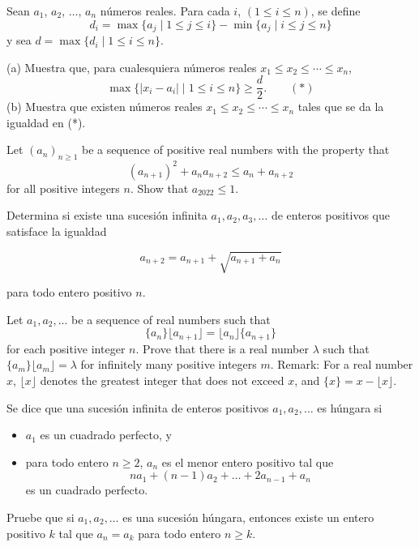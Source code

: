 \documentclass[11pt]{scrartcl}
\begin{document}
\begin{problem}
    Sean $ a_{1}$, $ a_{2}$, $ \ldots$, $ a_{n}$ números reales. Para cada $ i$, $ (1 \leq i \leq n )$, se define
\[ d_{i} = \max \{ a_{j}\mid 1 \leq j \leq i \} - \min \{ a_{j}\mid i \leq j \leq n \}
\]
y sea $ d = \max \{d_{i}\mid 1 \leq i \leq n \}$.

(a) Muestra que, para cualesquiera números reales $ x_{1}\leq x_{2}\leq \cdots \leq x_{n}$,
\[ \max \{ |x_{i} - a_{i}| \mid 1 \leq i \leq n \}\geq \frac {d}{2}. \quad \quad (*)
\]
(b) Muestra que existen números reales $ x_{1}\leq x_{2}\leq \cdots \leq x_{n}$ tales que se da la igualdad en (*).
\end{problem}


\begin{problem}
    Let $(a_n)_{n\geq 1}$ be a sequence of positive real numbers with the property that
$$(a_{n+1})^2 + a_na_{n+2} \leq a_n + a_{n+2}$$for all positive integers $n$. Show that $a_{2022}\leq 1$.
\end{problem}
\begin{problem}
    
    Determina si existe una sucesión infinita $a_1, a_2, a_3, \dots$ de enteros positivos que satisface
la igualdad

\[a_{n+2}=a_{n+1}+\sqrt{a_{n+1}+a_{n}} \]

para todo entero positivo $n$.
    
\end{problem}

\begin{problem}
    Let $a_1, a_2, \dots$ be a sequence of real numbers such that
$$ \{a_n\}\lfloor {a_{n+1}} \rfloor = \lfloor{a_n} \rfloor \{a_{n+1}\} $$for each positive integer $n$.
Prove that there is a real number $\lambda$ such that $\{a_m\}\lfloor{a_m} \rfloor = \lambda$ for infinitely many positive integers $m$.
Remark: For a real number \(x\), \(\lfloor x \rfloor\) denotes the greatest integer that does not exceed \(x\), and ${\{x\}=x-\lfloor x \rfloor}$.
\end{problem}

\begin{problem}
    
    Se dice que una sucesión infinita de enteros positivos $a_1, a_2, \dots$ es húngara si
 \begin{itemize} 
 \item  $a_1$ es un cuadrado perfecto, y
 \item  para todo entero $n\ge 2$, $a_n$ es el menor entero positivo tal que \[na_1+(n-1)a_2+\dots+2a_{n-1}+a_n\]
es un cuadrado perfecto.
 \end{itemize} 
Pruebe que si $a_1, a_2, \dots$ es una sucesión húngara, entonces existe un entero positivo $k$ tal que $a_n=a_k$ para todo entero $n\geq k$.
    
\end{problem}
\end{document}
